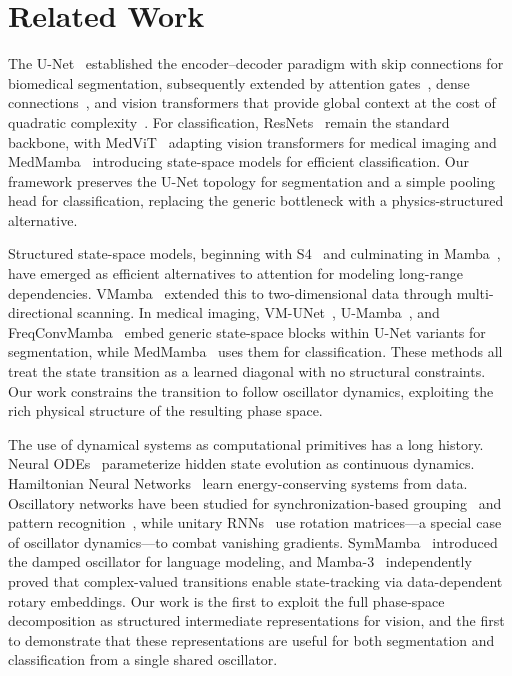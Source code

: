 \documentclass[11pt]{article}
\begin{document}
\section{Related Work}
\label{sec:related}

The U-Net~\cite{ronneberger2015unet} established the encoder--decoder paradigm with skip connections for biomedical segmentation, subsequently extended by attention gates~\cite{oktay2018attention}, dense connections~\cite{huang2020unet3plus}, and vision transformers that provide global context at the cost of quadratic complexity~\cite{chen2021transunet,cao2022swinunet}. For classification, ResNets~\cite{he2016resnet} remain the standard backbone, with MedViT~\cite{medvit2023} adapting vision transformers for medical imaging and MedMamba~\cite{yue2024medmamba} introducing state-space models for efficient classification. Our framework preserves the U-Net topology for segmentation and a simple pooling head for classification, replacing the generic bottleneck with a physics-structured alternative.

Structured state-space models, beginning with S4~\cite{gu2022s4} and culminating in Mamba~\cite{gu2023mamba}, have emerged as efficient alternatives to attention for modeling long-range dependencies. VMamba~\cite{liu2024vmamba} extended this to two-dimensional data through multi-directional scanning. In medical imaging, VM-UNet~\cite{ruan2024vmunet}, U-Mamba~\cite{ma2024umamba}, and FreqConvMamba~\cite{freqconvmamba2026} embed generic state-space blocks within U-Net variants for segmentation, while MedMamba~\cite{yue2024medmamba} uses them for classification. These methods all treat the state transition as a learned diagonal with no structural constraints. Our work constrains the transition to follow oscillator dynamics, exploiting the rich physical structure of the resulting phase space.

The use of dynamical systems as computational primitives has a long history. Neural ODEs~\cite{chen2018neuralode} parameterize hidden state evolution as continuous dynamics. Hamiltonian Neural Networks~\cite{greydanus2019hamiltonian} learn energy-conserving systems from data. Oscillatory networks have been studied for synchronization-based grouping~\cite{wang1995oscillatory} and pattern recognition~\cite{hoppensteadt1999oscillatory}, while unitary RNNs~\cite{arjovsky2016unitary} use rotation matrices---a special case of oscillator dynamics---to combat vanishing gradients. SymMamba~\cite{symmamba2025} introduced the damped oscillator for language modeling, and Mamba-3~\cite{mamba3} independently proved that complex-valued transitions enable state-tracking via data-dependent rotary embeddings. Our work is the first to exploit the full phase-space decomposition as structured intermediate representations for vision, and the first to demonstrate that these representations are useful for both segmentation and classification from a single shared oscillator.
\end{document}

